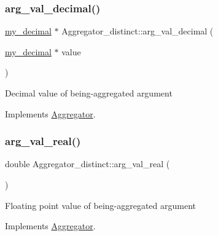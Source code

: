 \mbox{\label{classAggregator__distinct_a60e5fc048746277c661ce97e9fc92905}} 
\subsubsection{\texorpdfstring{arg\+\_\+val\+\_\+decimal()}{arg\_val\_decimal()}}
{\footnotesize\ttfamily \mbox{\hyperlink{classmy__decimal}{my\+\_\+decimal}} $\ast$ Aggregator\+\_\+distinct\+::arg\+\_\+val\+\_\+decimal (\begin{DoxyParamCaption}\item[{\mbox{\hyperlink{classmy__decimal}{my\+\_\+decimal}} $\ast$}]{value }\end{DoxyParamCaption})\hspace{0.3cm}{\ttfamily [virtual]}}

Decimal value of being-\/aggregated argument 

Implements \mbox{\hyperlink{classAggregator_a0965a66058cd00c581b015b9c571cb07}{Aggregator}}.

\mbox{\label{classAggregator__distinct_a3485cfa42d584711c4c95a3405f4a2ad}} 
\subsubsection{\texorpdfstring{arg\+\_\+val\+\_\+real()}{arg\_val\_real()}}
{\footnotesize\ttfamily double Aggregator\+\_\+distinct\+::arg\+\_\+val\+\_\+real (\begin{DoxyParamCaption}{ }\end{DoxyParamCaption})\hspace{0.3cm}{\ttfamily [virtual]}}

Floating point value of being-\/aggregated argument 

Implements \mbox{\hyperlink{classAggregator_addca16d20f7cc2640f3843c2c5e7596d}{Aggregator}}.

\mbox{\label{classAggregator__distinct_acb3c9529bc839900fc63eb890a5e2aee}} 
